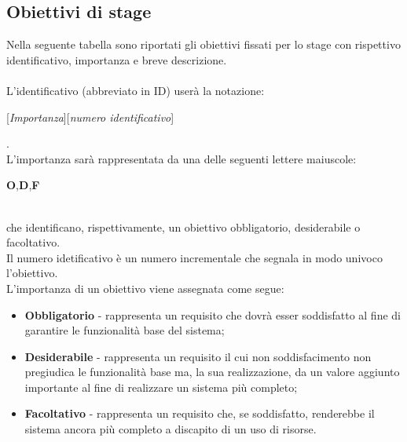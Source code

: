 \subsection{Obiettivi di stage}
Nella seguente tabella sono riportati gli obiettivi fissati per lo stage con rispettivo identificativo, importanza e breve descrizione.\\\\
L'identificativo (abbreviato in ID) userà la notazione:\\
\centerline{[\textit{Importanza}][\textit{numero identificativo}]}.\\
L'importanza sarà rappresentata da una delle seguenti lettere maiuscole:\\
\centerline{\textbf{O},\textbf{D},\textbf{F}}\\
che identificano, rispettivamente, un obiettivo obbligatorio, desiderabile o facoltativo.\\
Il numero idetificativo è un numero incrementale che segnala in modo univoco l’obiettivo.\\
L'importanza di un obiettivo viene assegnata come segue:
\begin{itemize}
	\item \textbf{Obbligatorio} - rappresenta un requisito che dovrà esser soddisfatto al fine di garantire le funzionalità base del sistema;
	\item \textbf{Desiderabile} - rappresenta un requisito il cui non soddisfacimento non pregiudica le funzionalità base ma, la sua realizzazione, da un valore aggiunto importante al fine di realizzare un sistema più completo;
	\item \textbf{Facoltativo} - rappresenta un requisito che, se soddisfatto, renderebbe il sistema ancora più completo a discapito di un uso di risorse.
\end{itemize}
